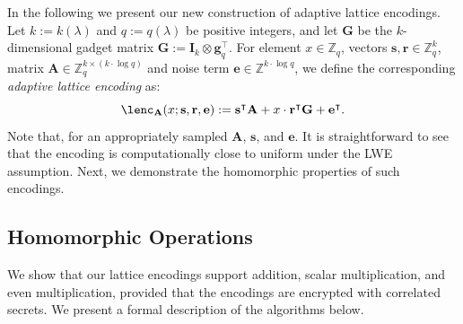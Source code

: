 \documentclass{theoretics}
\newcommand{\Z}{\mathbb{Z}}
\renewcommand{\sec}{\ensuremath{\lambda}}
\newcommand{\id}{\ensuremath{\mathbf{I}}}
\begin{document}
In the following we present our new construction of adaptive lattice encodings. Let $k:=k(\sec)$ and $q:=q(\sec)$ be positive integers, and let $\mathbf{G}$ be the $k$-dimensional gadget matrix $\mathbf{G}:=\id_k\otimes \mathbf{g}_q^\intercal$. For element $x\in\Z_q$, vectors $\mathbf{s}, \mathbf{r}\in\Z_q^k$, matrix $\mathbf{A}\in\Z_q^{k\times (k\cdot \log q)}$ and noise term $\mathbf{e}\in\Z^{k\cdot \log q}$, we define the corresponding \emph{adaptive lattice encoding} as:
\[
\lenc_\mathbf{A} (x;\mathbf{s}, \mathbf{r}, \mathbf{e}) := \mathbf{s}^\intercal\mathbf{A}+ x \cdot \mathbf{r}^\intercal \mathbf{G}+\mathbf{e}^\intercal.
\]
Note that, for an appropriately sampled $\mathbf{A}$, $\mathbf{s}$, and $\mathbf{e}$. It is straightforward to see that the encoding is computationally close to uniform under the LWE assumption. Next, we demonstrate the homomorphic properties of such encodings.

\subsection{Homomorphic Operations}\label{sec:hom_enc}

We show that our lattice encodings support addition, scalar multiplication, and even multiplication, provided that the encodings are encrypted with correlated secrets. We present a formal description of the algorithms below.
\end{document}
